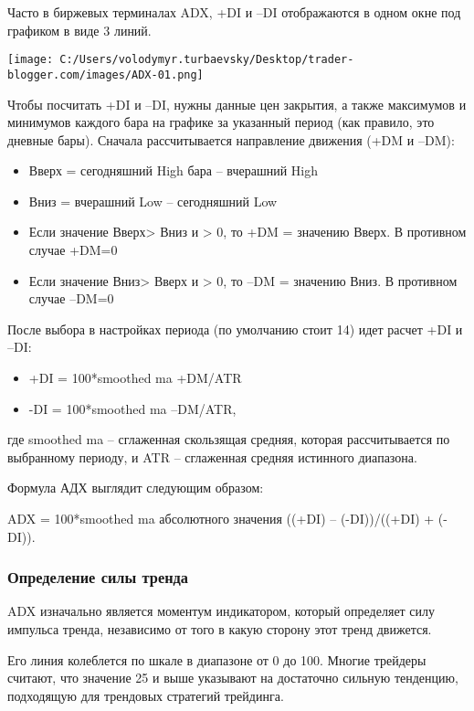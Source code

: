 \documentclass[a5paper]{article}
\begin{document}
Часто в биржевых терминалах ADX, +DI и –DI отображаются в одном окне
под графиком в виде 3 линий.

\texttt{[image: C:/Users/volodymyr.turbaevsky/Desktop/trader-blogger.com/images/ADX-01.png]}

Чтобы посчитать +DI и –DI, нужны данные цен закрытия, а также максимумов и минимумов каждого бара на графике за указанный период (как правило, это дневные бары). Сначала рассчитывается направление движения (+DM и –DM):
\begin{itemize}
\item     Вверх = сегодняшний High бара – вчерашний High
\item     Вниз = вчерашний Low – сегодняшний Low
\item     Если значение Вверх> Вниз и > 0, то +DM = значению Вверх. В противном случае +DM=0
\item     Если значение Вниз> Вверх и > 0, то –DM = значению Вниз. В противном случае –DM=0
\end{itemize}

После выбора в настройках периода (по умолчанию стоит 14) идет расчет +DI и –DI:
\begin{itemize}
\item     +DI = 100*smoothed ma +DM/ATR
\item     -DI = 100*smoothed ma –DM/ATR,
\end{itemize}

где smoothed ma – сглаженная скользящая средняя, которая рассчитывается по выбранному периоду, и ATR – сглаженная средняя истинного диапазона.

Формула АДХ выглядит следующим образом:

    ADX = 100*smoothed ma абсолютного значения ((+DI) – (-DI))/((+DI)
    + (-DI)).

\subsubsection{Определение силы тренда}

ADX изначально является моментум индикатором, который определяет силу импульса тренда, независимо от того в какую сторону этот тренд движется.

Его линия колеблется по шкале в диапазоне от 0 до 100. Многие трейдеры считают, что значение 25 и выше указывают на достаточно сильную тенденцию, подходящую для трендовых стратегий трейдинга.
\end{document}
